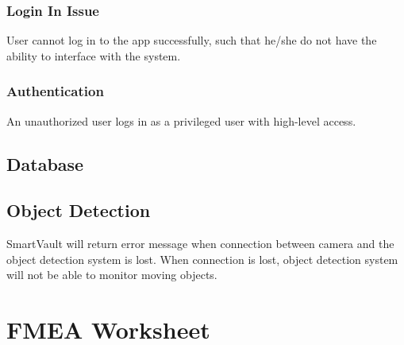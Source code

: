 \documentclass{article}
\begin{document}
\subsubsection{Login In Issue}
User cannot log in to the app successfully, such that he/she do not have the ability to interface with the system.
\subsubsection{Authentication}
An unauthorized user logs in as a privileged user with high-level access.
\subsection{Database}
\subsection{Object Detection}
SmartVault will return error message when connection between camera and the object detection system is lost. When connection is lost, object detection system will not be able to monitor moving objects.


\section{FMEA Worksheet}
\end{document}
